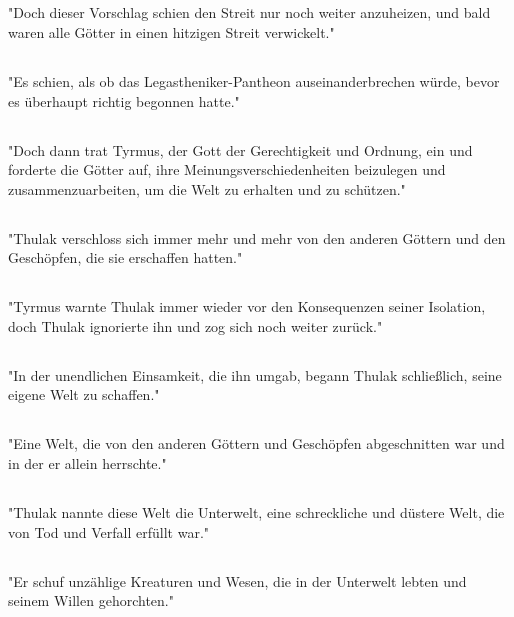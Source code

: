 \documentclass{article}
\begin{document}
\subsection{}
"Doch dieser Vorschlag schien den Streit nur noch weiter anzuheizen, und bald waren alle Götter in einen hitzigen Streit verwickelt."
\subsection{}
"Es schien, als ob das Legastheniker-Pantheon auseinanderbrechen würde, bevor es überhaupt richtig begonnen hatte."
\subsection{}
"Doch dann trat Tyrmus, der Gott der Gerechtigkeit und Ordnung, ein und forderte die Götter auf, ihre Meinungsverschiedenheiten beizulegen und zusammenzuarbeiten, um die Welt zu erhalten und zu schützen."
\subsection{}
"Thulak verschloss sich immer mehr und mehr von den anderen Göttern und den Geschöpfen, die sie erschaffen hatten."
\subsection{}
"Tyrmus warnte Thulak immer wieder vor den Konsequenzen seiner Isolation, doch Thulak ignorierte ihn und zog sich noch weiter zurück."
\subsection{}
"In der unendlichen Einsamkeit, die ihn umgab, begann Thulak schließlich, seine eigene Welt zu schaffen."
\subsection{}
"Eine Welt, die von den anderen Göttern und Geschöpfen abgeschnitten war und in der er allein herrschte."
\subsection{}
"Thulak nannte diese Welt die Unterwelt, eine schreckliche und düstere Welt, die von Tod und Verfall erfüllt war."
\subsection{}
"Er schuf unzählige Kreaturen und Wesen, die in der Unterwelt lebten und seinem Willen gehorchten."
\end{document}
